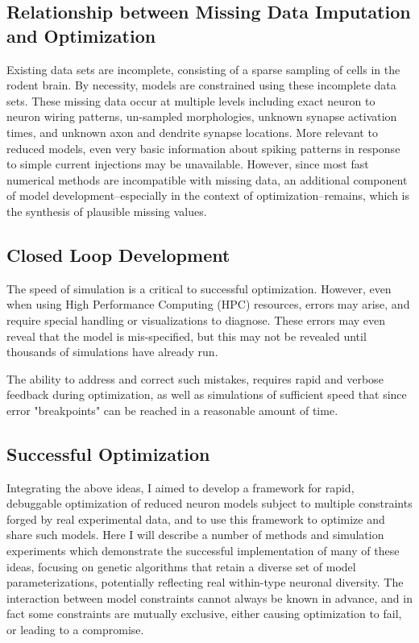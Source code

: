 \subsection{Relationship between Missing Data Imputation and Optimization}
Existing data sets are incomplete, consisting of a sparse sampling of cells in the rodent brain. By necessity, models are constrained using these incomplete data sets.
These missing data occur at multiple levels including exact neuron to neuron wiring patterns, un-sampled morphologies, unknown synapse activation times, and unknown axon and dendrite synapse locations.
More relevant to reduced models, even very basic information about spiking patterns in response to simple current injections may be unavailable.
However, since most fast numerical methods are incompatible with missing data, an additional component of model development--especially in the context of optimization--remains, which is the synthesis of plausible missing values.

\subsection{Closed Loop Development}
The speed of simulation is a critical to successful optimization. However, even when using High Performance Computing (HPC) resources, errors may arise, and require special handling or visualizations to diagnose.  
These errors may even reveal that the model is mis-specified, but this may not be revealed until thousands of simulations have already run.

The ability to address and correct such mistakes, requires rapid and verbose feedback during optimization, as well as simulations of sufficient speed that since error "breakpoints" can be reached in a reasonable amount of time.

\subsection{Successful Optimization} 
Integrating the above ideas, I aimed to develop a framework for rapid, debuggable optimization of reduced neuron models subject to multiple constraints forged by real experimental data, and to use this framework to optimize and share such models.
Here I will describe a number of methods and simulation experiments which demonstrate the successful implementation of many of these ideas, focusing on genetic algorithms that retain a diverse set of model parameterizations, potentially reflecting real within-type neuronal diversity.
The interaction between model constraints cannot always be known in advance, and in fact some constraints are mutually exclusive, either causing optimization to fail, or leading to a compromise.

